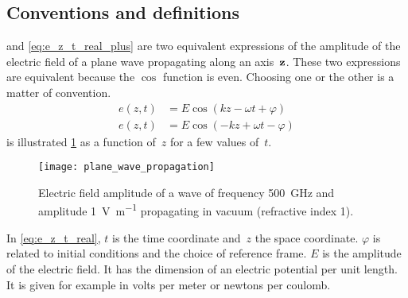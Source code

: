 \subsection{Conventions and definitions}
 and \cref{eq:e_z_t_real_plus} are two equivalent expressions of the amplitude of the electric field of a plane wave propagating along an axis~$\textbf{z}$.
These two expressions are equivalent because the $\cos$ function is even.
Choosing one or the other is a matter of convention.
\begin{subequations}
    \begin{align}
       e(z, t) &= E \cos( kz - \omega t + \varphi)   \label{eq:e_z_t_real_minus} \\
       e(z, t) &= E \cos(-kz + \omega t - \varphi)   \label{eq:e_z_t_real_plus}
    \end{align}
    \label{eq:e_z_t_real}
\end{subequations}
 is illustrated \cref{fig:plane_wave_propagation} as a function of~$z$ for a few values of~$t$.
\begin{figure}[hbp]
    \centering
    \texttt{[image: plane\_wave\_propagation]}
    \caption {\label{fig:plane_wave_propagation}Electric field amplitude of a wave of frequency \SI{500}{\giga\hertz} and amplitude \SI{1}{\volt\per\meter} propagating in vacuum (refractive index 1).}
\end{figure}

In \cref{eq:e_z_t_real}, $t$ is the time coordinate and~$z$ the space coordinate.
$\varphi$ is related to initial conditions and the choice of reference frame.
$E$ is the amplitude of the electric field.
It has the dimension of an electric potential per unit length.
It is given for example in volts per meter or newtons per coulomb.

